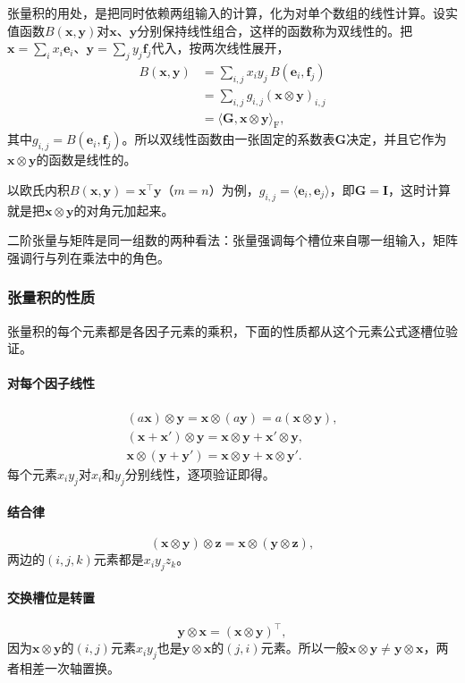 张量积的用处，是把同时依赖两组输入的计算，化为对单个数组的线性计算。设实值函数$B(\bm x,\bm y)$对$\bm x$、$\bm y$分别保持线性组合，这样的函数称为双线性的。把$\bm x=\sum_ix_i\bm e_i$、$\bm y=\sum_jy_j\bm f_j$代入，按两次线性展开，
\[
 \begin{aligned}
 B(\bm x,\bm y)
 &=\sum_{i,j}x_iy_j\,B(\bm e_i,\bm f_j)\\
 &=\sum_{i,j}g_{i,j}(\bm x\otimes\bm y)_{i,j}\\
 &=\langle\bm G,\bm x\otimes\bm y\rangle_{\mathrm F},
 \end{aligned}
\]
其中$g_{i,j}=B(\bm e_i,\bm f_j)$。所以双线性函数由一张固定的系数表$\bm G$决定，并且它作为$\bm x\otimes\bm y$的函数是线性的。

以欧氏内积$B(\bm x,\bm y)=\bm x^\top\bm y$（$m=n$）为例，$g_{i,j}=\langle\bm e_i,\bm e_j\rangle$，即$\bm G=\bm I$，这时计算就是把$\bm x\otimes\bm y$的对角元加起来。

二阶张量与矩阵是同一组数的两种看法：张量强调每个槽位来自哪一组输入，矩阵强调行与列在乘法中的角色。

\subsubsection{张量积的性质}
\label{sec:ls-tensor-product-properties}

张量积的每个元素都是各因子元素的乘积，下面的性质都从这个元素公式逐槽位验证。

\paragraph{对每个因子线性}
\[
 \begin{gathered}
(a\bm x)\otimes\bm y=\bm x\otimes(a\bm y)=a(\bm x\otimes\bm y),\\
(\bm x+\bm x')\otimes\bm y=\bm x\otimes\bm y+\bm x'\otimes\bm y,\\
\bm x\otimes(\bm y+\bm y')=\bm x\otimes\bm y+\bm x\otimes\bm y'.
 \end{gathered}
\]
每个元素$x_iy_j$对$x_i$和$y_j$分别线性，逐项验证即得。

\paragraph{结合律}
\[
 (\bm x\otimes\bm y)\otimes\bm z=\bm x\otimes(\bm y\otimes\bm z),
\]
两边的$(i,j,k)$元素都是$x_iy_jz_k$。

\paragraph{交换槽位是转置}
\[
 \bm y\otimes\bm x=(\bm x\otimes\bm y)^\top,
\]
因为$\bm x\otimes\bm y$的$(i,j)$元素$x_iy_j$也是$\bm y\otimes\bm x$的$(j,i)$元素。所以一般$\bm x\otimes\bm y\neq\bm y\otimes\bm x$，两者相差一次轴置换。

